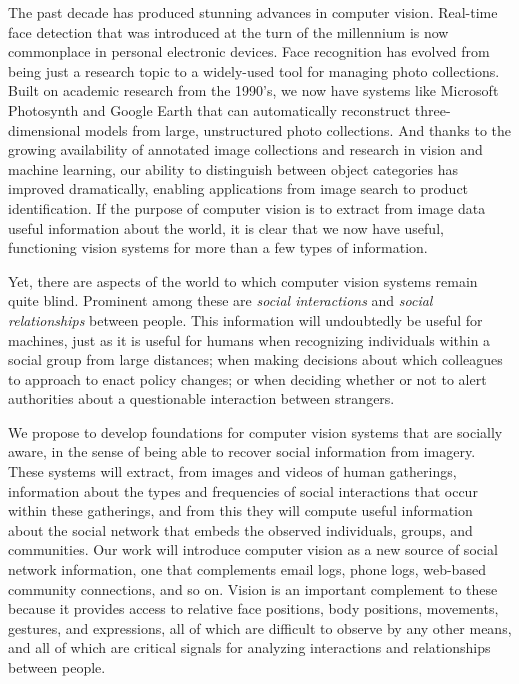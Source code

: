 \pagestyle{plain} 

 \label{sec:intro}

The past decade has produced stunning advances in computer vision. Real-time face detection that was introduced at the turn of the millennium is now commonplace in personal electronic devices. Face recognition has evolved from being just a research topic to a widely-used tool for managing photo collections. Built on academic research from the 1990's, we now have systems like Microsoft Photosynth and Google Earth that can automatically reconstruct three-dimensional models from large, unstructured photo collections. And thanks to the growing availability of annotated image collections and research in vision and machine learning, our ability to distinguish between object categories has improved dramatically, enabling applications from image search to product identification. If the purpose of computer vision is to extract from image data useful information about the world, it is clear that we now have useful, functioning vision systems for more than a few types of information. 

Yet, there are aspects of the world to which computer vision systems remain quite blind. Prominent among these are \emph{social interactions} and \emph{social relationships} between people. This information will undoubtedly be useful for machines, just as it is useful for humans when recognizing individuals within a social group from large distances; when making decisions about which colleagues to approach to enact policy changes; or when deciding whether or not to alert authorities about a questionable interaction between strangers.

We propose to develop foundations for computer vision systems that are socially aware, in the sense of being able to recover social information from imagery. These systems will extract, from images and videos of human gatherings,  information about the types and frequencies of social interactions that occur within these gatherings, and from this they will compute useful information about the social network that embeds the observed individuals, groups, and communities.  Our work will introduce computer vision as a new source of social network information, one that complements email logs, phone logs, web-based community connections, and so on. Vision is an important complement to these because it provides access to relative face positions, body positions, movements, gestures, and expressions, all of which are difficult to observe by any other means, and all of which are critical signals for analyzing interactions and relationships between people. 


